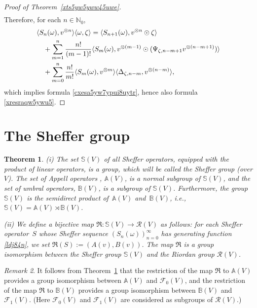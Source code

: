 \documentclass[12pt]{article}
\newtheorem{theorem}{Theorem}[section]
\theoremstyle{remark}
\theoremstyle{remark}
\theoremstyle{remark}
\newtheorem{remark}[theorem]{Remark}
\begin{document}
\begin{proof}[Proof of Theorem~\ref{xts5yw5yww45uwe}]
\begin{align}
 \end{align}
 Therefore,  for each $n\in\mathbb N_0$,
 \begin{align}
&\langle S_n(\omega),v^{\otimes n}\rangle\langle\omega,\zeta\rangle=\langle S_{n+1}(\omega),v^{\otimes n}\odot\zeta\rangle\notag\\
&\quad+
\sum_{m=1}^{n}\frac{n!}{(m-1)!}\langle S_m(\omega),v^{\otimes(m-1)}\odot(\Psi_{\zeta,n-m+1}v^{\otimes(n-m+1)})\rangle\notag\\
&\quad + \sum_{m=0}^{n}\frac{n!}{m!}\langle S_m(\omega),v^{\otimes m}\rangle \langle \Delta_{\zeta,n-m},v^{\otimes(n-m)}\rangle,\notag
 \end{align} 
 which implies formula \eqref{cxesa5yw7ypui8uytr}, hence also formula \eqref{xresraqw5ywu5}. 
  \end{proof}
  
  
\section{The Sheffer group} \label{cfdrseepioioi}

\begin{theorem} \label{cxdsresay5e}
{\rm (i)} The set  $\mathbb S(V)$ of all Sheffer operators, equipped with the product of linear operators, is a group, which will be called the Sheffer group (over $V$). 
The set of Appell operators , $\mathbb A(V)$, is a normal subgroup of $\mathbb S(V)$, and the set of umbral operators, $\mathbb B(V)$, is a   subgroup of $\mathbb S(V)$. Furthermore, the group $\mathbb S(V)$ is the semidirect product of~$\mathbb A(V)$ and~$\mathbb B(V)$, i.e., $\mathbb S(V)=\mathbb A(V)\rtimes \mathbb B(V)$. 


{\rm (ii)} We define a bijective map $\mathfrak R:\mathbb S(V) \to \mathcal R(V)$ as follows: for each Sheffer operator~$S$ whose Sheffer sequence $(S_n(\omega))_{n=0}^\infty$ has generating function \eqref{ldj84n}, we set $\mathfrak R(S):=(A(v),B(v))$. The map $\mathfrak  R$ is a group isomorphism between the Sheffer group $\mathbb S(V)$ and the Riordan group $\mathcal R(V)$.
\end{theorem}

\begin{remark}
It follows from Theorem~\ref{cxdsresay5e} that the restriction of the map $\mathfrak R$ to $\mathbb A(V)$ provides a group isomorphism between $\mathbb A(V)$ and $\mathcal F_0(V)$, and the restriction of the map $\mathfrak R$ to $\mathbb B(V)$ provides a group isomorphism between $\mathbb B(V)$ and $\mathcal F_1(V)$. (Here $\mathcal F_0(V)$ and $\mathcal F_1(V)$ are considered as subgroups of $\mathcal R(V)$.)
\end{remark}
\end{document}
